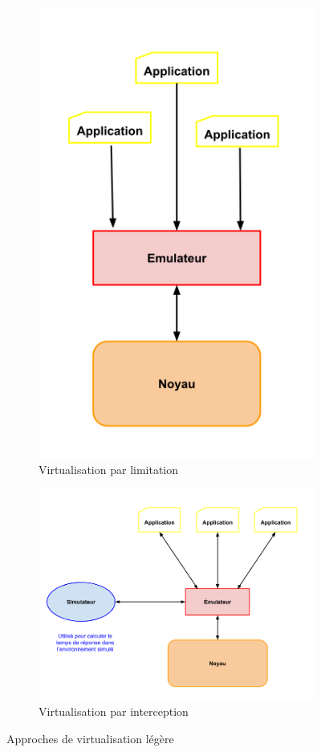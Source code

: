 \begin{figure}[H]
  \centering
  \begin{subfigure}{0.3\textwidth}
    \includegraphics[scale=0.38]{Pictures/png/Virtualisation_limitation}
    \caption{Virtualisation par limitation}
    \label{Virtu_limitation}
  \end{subfigure}
  \begin{subfigure}{0.4\textwidth}
    \includegraphics[scale=0.3]{Pictures/png/Virtualisation_interception}
    \caption{Virtualisation par interception}
    \label{Virtu_interception}
  \end{subfigure}
  \caption{Approches de virtualisation légère}
  \label{TYPE_VIRTUALISATION}
\end{figure}
